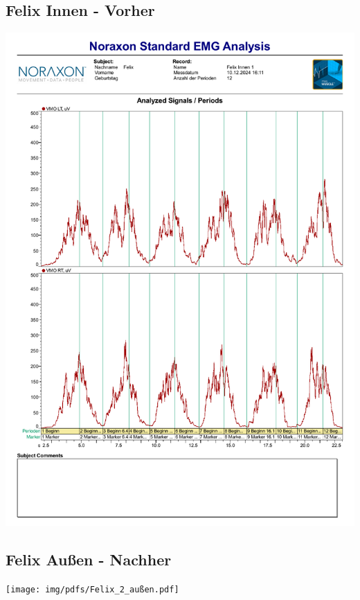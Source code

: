\subsection*{Felix Innen - Vorher}
\includegraphics[width=.9\textwidth]{img/pdfs/Felix_Innen_1.pdf}
\clearpage

\subsection*{Felix Außen - Nachher}
\texttt{[image: img/pdfs/Felix\_2\_außen.pdf]}
\clearpage

